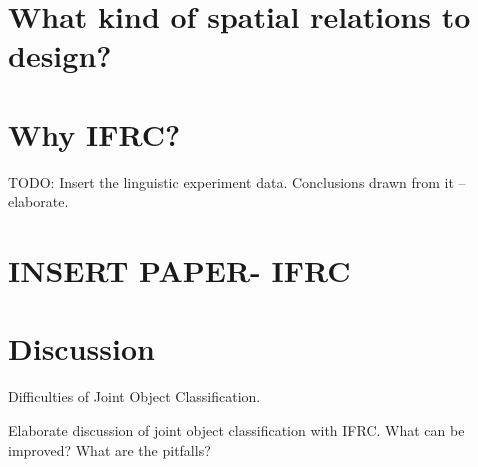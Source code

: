 \section{What kind of spatial relations to design?}
\section{Why IFRC?}
TODO: Insert the linguistic experiment data. Conclusions drawn from it -- elaborate.
\section{INSERT PAPER- IFRC}
\section{Discussion}
Difficulties of Joint Object Classification.

Elaborate discussion of joint object classification with IFRC. What can be 
improved? What are the pitfalls?
